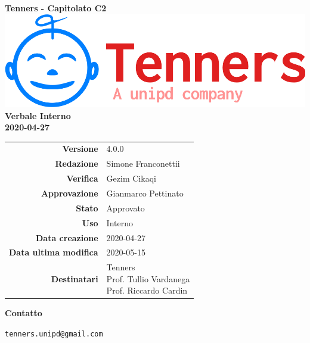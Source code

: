 \begin{titlepage}
	\begin{center}
		\large \textbf{Tenners - Capitolato C2}
		\vfill
		\includegraphics[scale = 0.3]{./res/img/logo.png}\\
		\vfill
		\Huge \textbf{Verbale Interno} \\
		\textbf {2020-04-27}

        \vfill
        \large

        \begin{tabular}{r|l}
                        \textbf{Versione} & 4.0.0 \\
                        \textbf{Redazione} & Simone Franconettii \\
                        \textbf{Verifica} & Gezim Cikaqi\\
                        \textbf{Approvazione} & Gianmarco Pettinato  \\
                        \textbf{Stato} & Approvato \\
                        \textbf{Uso} &  Interno\\
                        \textbf{Data creazione} &  2020-04-27\\
                        \textbf{Data ultima modifica} &  2020-05-15\\
                        \textbf{Destinatari} & \parbox[t]{5cm}{Tenners \\ Prof. Tullio Vardanega\\ Prof. Riccardo Cardin}
                \end{tabular}
                \vfill
                \normalsize
                \vfill
                \textbf{Contatto}

                \texttt{tenners.unipd@gmail.com}

	\end{center}
\end{titlepage}
